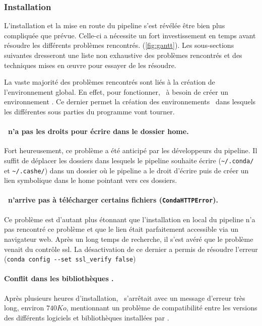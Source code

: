 \documentclass[../main]{subfiles} %
\begin{document}
\subsubsection{Installation}
L’installation et la mise en route du pipeline s'est révélée être bien plus compliquée que prévue. Celle-ci a nécessite un fort investissement en temps avant résoudre les différents problèmes rencontrés. (\cref{fig:gantt}). Les sous-sections suivantes dresseront une liste non exhaustive des problèmes rencontrés et des techniques mises en œuvre pour essayer de les résoudre.

La vaste majorité des problèmes rencontrés sont liés à la création de l’environnement global. En effet, pour fonctionner, \GeCKO à besoin de créer un environnement \Conda. Ce dernier permet la création des environnements \SnakeMake dans lesquels les différentes sous parties du programme vont tourner. 

\paragraph{\Slurm n’a pas les droits pour écrire dans le dossier home.} Fort heureusement, ce problème a été anticipé par les développeurs du pipeline. Il suffit de déplacer les dossiers dans lesquels le pipeline souhaite écrire (\lstinline{~/.conda/} et \lstinline{~/.cashe/}) dans un dossier où le pipeline a le droit d’écrire puis de créer un lien symbolique dans le home pointant vers ces dossiers.

\paragraph{\Conda n’arrive pas à télécharger certains fichiers (\lstinline{CondaHTTPError}).} Ce problème est d’autant plus étonnant que l’installation en local du pipeline n’a pas rencontré ce problème et que le lien était parfaitement accessible via un navigateur web. Après un long temps de recherche, il s’est avéré que le problème venait du contrôle ssl. La désactivation de ce dernier a permis de résoudre l’erreur (\lstinline{conda config --set ssl_verify false})

\paragraph{Conflit dans les bibliothèques \Conda.} Après plusieurs heures d’installation, \Conda s’arrêtait avec un message d’erreur très long, environ $\num{740} Ko$, mentionnant un problème de compatibilité entre les versions des différents logiciels et bibliothèques installées par \Conda.
\end{document}
